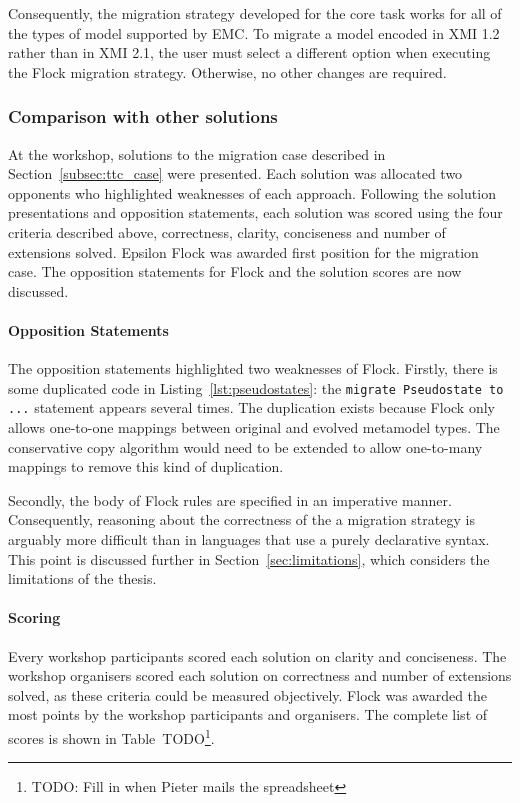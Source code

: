 Consequently, the migration strategy developed for the core task works for all of the types of model supported by EMC. To migrate a model encoded in XMI 1.2 rather than in XMI 2.1, the user must select a different option when executing the Flock migration strategy. Otherwise, no other changes are required.

\subsubsection{Comparison with other solutions}
At the workshop, solutions to the migration case described in Section~\ref{subsec:ttc_case} were presented. Each solution was allocated two opponents who highlighted weaknesses of each approach. Following the solution presentations and opposition statements, each solution was scored using the four criteria described above, correctness, clarity, conciseness and number of extensions solved. Epsilon Flock was awarded first position for the migration case. The opposition statements for Flock and the solution scores are now discussed.

\paragraph{Opposition Statements} The opposition statements highlighted two weaknesses of Flock. Firstly, there is some duplicated code in Listing~\ref{lst:pseudostates}: the \texttt{migrate Pseudostate to ...} statement appears several times. The duplication exists because Flock only allows one-to-one mappings between original and evolved metamodel types. The conservative copy algorithm would need to be extended to allow one-to-many mappings to remove this kind of duplication.

Secondly, the body of Flock rules are specified in an imperative manner. Consequently, reasoning about the correctness of the a migration strategy is arguably more difficult than in languages that use a purely declarative syntax. This point is discussed further in Section~\ref{sec:limitations}, which considers the limitations of the thesis.

\paragraph{Scoring} Every workshop participants scored each solution on clarity and conciseness. The workshop organisers scored each solution on correctness and number of extensions solved, as these criteria could be measured objectively. Flock was awarded the most points by the workshop participants and organisers. The complete list of scores is shown in Table~TODO\footnote{TODO: Fill in when Pieter mails the spreadsheet}.

